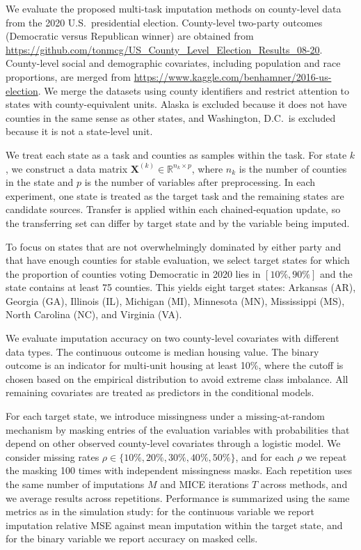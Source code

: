 \documentclass[12pt]{article}
\begin{document}
We evaluate the proposed multi-task imputation methods on county-level data from the 2020 U.S.\ presidential election. County-level two-party outcomes (Democratic versus Republican winner) are obtained from \url{https://github.com/tonmcg/US_County_Level_Election_Results_08-20}. County-level social and demographic covariates, including population and race proportions, are merged from \url{https://www.kaggle.com/benhamner/2016-us-election}. We merge the datasets using county identifiers and restrict attention to states with county-equivalent units. Alaska is excluded because it does not have counties in the same sense as other states, and Washington, D.C.\ is excluded because it is not a state-level unit.

We treat each state as a task and counties as samples within the task. For state $k$, we construct a data matrix $\bm{X}^{(k)}\in\mathbb{R}^{n_k\times p}$, where $n_k$ is the number of counties in the state and $p$ is the number of variables after preprocessing. In each experiment, one state is treated as the target task and the remaining states are candidate sources. Transfer is applied within each chained-equation update, so the transferring set can differ by target state and by the variable being imputed.

To focus on states that are not overwhelmingly dominated by either party and that have enough counties for stable evaluation, we select target states for which the proportion of counties voting Democratic in 2020 lies in $[10\%,90\%]$ and the state contains at least 75 counties. This yields eight target states: Arkansas (AR), Georgia (GA), Illinois (IL), Michigan (MI), Minnesota (MN), Mississippi (MS), North Carolina (NC), and Virginia (VA).

We evaluate imputation accuracy on two county-level covariates with different data types. The continuous outcome is median housing value. The binary outcome is an indicator for multi-unit housing at least 10\%, where the cutoff is chosen based on the empirical distribution to avoid extreme class imbalance. All remaining covariates are treated as predictors in the conditional models.

For each target state, we introduce missingness under a missing-at-random mechanism by masking entries of the evaluation variables with probabilities that depend on other observed county-level covariates through a logistic model. We consider missing rates $\rho\in\{10\%,20\%,30\%,40\%,50\%\}$, and for each $\rho$ we repeat the masking 100 times with independent missingness masks. Each repetition uses the same number of imputations $M$ and MICE iterations $T$ across methods, and we average results across repetitions. Performance is summarized using the same metrics as in the simulation study: for the continuous variable we report imputation relative MSE against mean imputation within the target state, and for the binary variable we report accuracy on masked cells.
\end{document}
